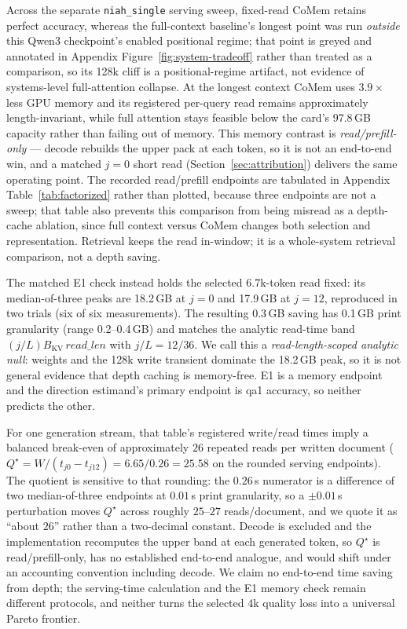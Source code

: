 Across the separate \texttt{niah\_single} serving sweep, fixed-read CoMem retains
perfect accuracy, whereas the full-context baseline's longest point was run
\emph{outside} this Qwen3 checkpoint's enabled positional regime; that point is
greyed and annotated in Appendix Figure~\ref{fig:system-tradeoff} rather than
treated as a comparison, so its 128k cliff is a positional-regime artifact, not
evidence of systems-level full-attention collapse.  At the longest context CoMem
uses $3.9\times$ less GPU memory and its registered per-query read remains
approximately length-invariant, while full attention stays feasible below the
card's 97.8\,GB capacity rather than failing out of memory.  This memory
contrast is \emph{read/prefill-only} --- decode rebuilds the upper pack at each
token, so it is not an end-to-end win, and a matched $j{=}0$ short read
(Section~\ref{sec:attribution}) delivers the same operating point.  The recorded
read/prefill endpoints are tabulated in Appendix Table~\ref{tab:factorized}
rather than plotted, because three endpoints are not a sweep; that table also
prevents this comparison from being misread as a depth-cache ablation, since full
context versus CoMem changes both selection and representation.  Retrieval keeps
the read in-window; it is a whole-system retrieval comparison, not a depth
saving.

The matched E1 check instead holds the selected 6.7k-token read fixed: its
median-of-three peaks are 18.2\,GB at $j=0$ and 17.9\,GB at $j=12$, reproduced
in two trials (six of six measurements).  The resulting 0.3\,GB saving has
0.1\,GB print granularity (range 0.2--0.4\,GB) and matches the analytic
read-time band $(j/L)B_{\mathrm{KV}}\,\textit{read\_len}$ with $j/L=12/36$.  We
call this a \emph{read-length-scoped analytic null}: weights and the 128k write
transient dominate the 18.2\,GB peak, so it is not general evidence that depth
caching is memory-free.  E1 is a memory endpoint and the direction estimand's
primary endpoint is qa1 accuracy, so neither predicts the other.

For one generation stream, that table's registered write/read times imply a
balanced break-even of approximately $26$ repeated reads per written document
($Q^{\star}=W/(t_{j0}-t_{j12})=6.65/0.26=25.58$ on the rounded serving
endpoints).  The quotient is sensitive to that rounding: the $0.26$\,s numerator
is a difference of two median-of-three endpoints at $0.01$\,s print granularity,
so a $\pm0.01$\,s perturbation moves $Q^{\star}$ across roughly $25$--$27$
reads/document, and we quote it as ``about $26$'' rather than a two-decimal
constant.  Decode is excluded and the implementation recomputes the upper band at
each generated token, so $Q^{\star}$ is read/prefill-only, has no established
end-to-end analogue, and would shift under an accounting convention including
decode.  We claim no end-to-end time saving from depth; the serving-time
calculation and the E1 memory check remain different protocols, and neither turns
the selected 4k quality loss into a universal Pareto frontier.

